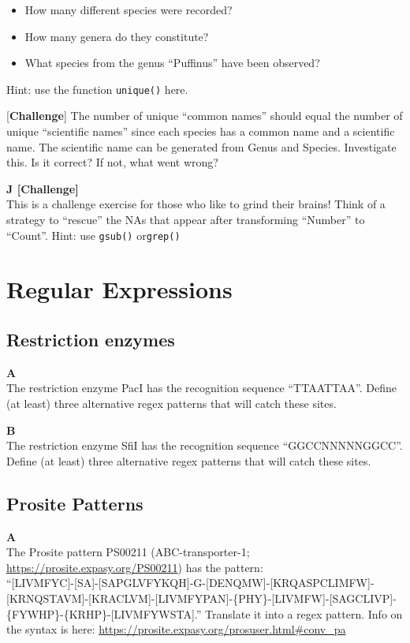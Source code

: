 \documentclass[]{book}
\providecommand{\tightlist}{%
  \setlength{\itemsep}{0pt}\setlength{\parskip}{0pt}}
\begin{document}
\begin{itemize}
\tightlist
\item
  How many different species were recorded?
\item
  How many genera do they constitute?
\item
  What species from the genus ``Puffinus'' have been observed?
\end{itemize}

Hint: use the function \texttt{unique()} here.

{[}\textbf{Challenge}{]} The number of unique ``common names'' should equal the number of unique ``scientific names'' since each species has a common name and a scientific name. The scientific name can be generated from Genus and Species. Investigate this. Is it correct? If not, what went wrong?

\textbf{J {[}Challenge{]}}\\
This is a challenge exercise for those who like to grind their brains! Think of a strategy to ``rescue'' the NAs that appear after transforming ``Number'' to ``Count''. Hint: use \texttt{gsub()} or\texttt{grep()}

\hypertarget{regular-expressions}{%
\section{Regular Expressions}\label{regular-expressions}}

\hypertarget{restriction-enzymes-1}{%
\subsection{Restriction enzymes}\label{restriction-enzymes-1}}

\textbf{A}\\
The restriction enzyme PacI has the recognition sequence ``TTAATTAA''. Define (at least) three alternative regex patterns that will catch these sites.

\textbf{B}\\
The restriction enzyme SfiI has the recognition sequence ``GGCCNNNNNGGCC''. Define (at least) three alternative regex patterns that will catch these sites.

\hypertarget{prosite-patterns-1}{%
\subsection{Prosite Patterns}\label{prosite-patterns-1}}

\textbf{A}\\
The Prosite pattern PS00211 (ABC-transporter-1; \url{https://prosite.expasy.org/PS00211}) has the pattern:\\
``{[}LIVMFYC{]}-{[}SA{]}-{[}SAPGLVFYKQH{]}-G-{[}DENQMW{]}-{[}KRQASPCLIMFW{]}-{[}KRNQSTAVM{]}-{[}KRACLVM{]}-{[}LIVMFYPAN{]}-\{PHY\}-{[}LIVMFW{]}-{[}SAGCLIVP{]}-\{FYWHP\}-\{KRHP\}-{[}LIVMFYWSTA{]}.''
Translate it into a regex pattern. Info on the syntax is here: \url{https://prosite.expasy.org/prosuser.html\#conv_pa}
\end{document}

